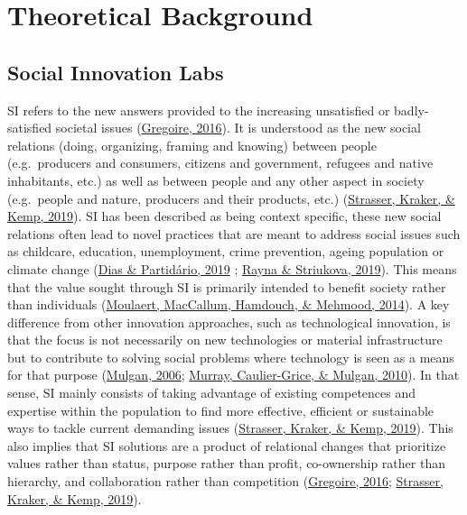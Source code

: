 \documentclass[]{elsarticle} %
\begin{document}
\hypertarget{theoretical-background}{%
\section{Theoretical Background}\label{theoretical-background}}

\hypertarget{social-innovation-labs}{%
\subsection{Social Innovation Labs}\label{social-innovation-labs}}

SI refers to the new answers provided to the increasing unsatisfied or
badly-satisfied societal issues
(\protect\hyperlink{ref-Gregoire2016}{Gregoire, 2016}). It is understood
as the new social relations (doing, organizing, framing and knowing)
between people (e.g.~producers and consumers, citizens and government,
refugees and native inhabitants, etc.) as well as between people and any
other aspect in society (e.g.~people and nature, producers and their
products, etc.) (\protect\hyperlink{ref-Strasser2019}{Strasser, Kraker,
\& Kemp, 2019}). SI has been described as being context specific, these
new social relations often lead to novel practices that are meant to
address social issues such as childcare, education, unemployment, crime
prevention, ageing population or climate change
(\protect\hyperlink{ref-Dias2019}{Dias \& Partidário, 2019} ;
\protect\hyperlink{ref-Rayna2019}{Rayna \& Striukova, 2019}). This means
that the value sought through SI is primarily intended to benefit
society rather than individuals
(\protect\hyperlink{ref-Moulaert2014}{Moulaert, MacCallum, Hamdouch, \&
Mehmood, 2014}). A key difference from other innovation approaches, such
as technological innovation, is that the focus is not necessarily on new
technologies or material infrastructure but to contribute to solving
social problems where technology is seen as a means for that purpose
(\protect\hyperlink{ref-Mulgan2006}{Mulgan, 2006};
\protect\hyperlink{ref-Murray2010}{Murray, Caulier-Grice, \& Mulgan,
2010}). In that sense, SI mainly consists of taking advantage of
existing competences and expertise within the population to find more
effective, efficient or sustainable ways to tackle current demanding
issues (\protect\hyperlink{ref-Strasser2019}{Strasser, Kraker, \& Kemp,
2019}). This also implies that SI solutions are a product of relational
changes that prioritize values rather than status, purpose rather than
profit, co-ownership rather than hierarchy, and collaboration rather
than competition (\protect\hyperlink{ref-Gregoire2016}{Gregoire, 2016};
\protect\hyperlink{ref-Strasser2019}{Strasser, Kraker, \& Kemp, 2019}).
\end{document}

